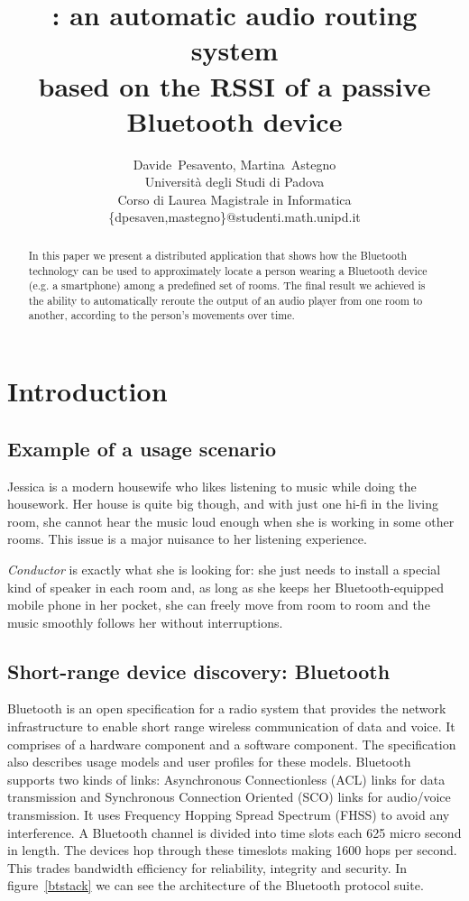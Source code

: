 \documentclass[conference]{IEEEtran}
\title{\Conductor{}: an automatic audio routing system\\based on the RSSI of a passive Bluetooth device}
\author{Davide~Pesavento, Martina~Astegno \\
	Università degli Studi di Padova \\
	Corso di Laurea Magistrale in Informatica \\
	\{dpesaven,mastegno\}@studenti.math.unipd.it
}
\newcommand{\Conductor}{\textsl{Conductor}}
\begin{document}
\maketitle

\begin{abstract}
In this paper we present a distributed application that shows how the Bluetooth technology can be used to approximately locate a person wearing a Bluetooth device (e.g. a smartphone) among a predefined set of rooms. The final result we achieved is the ability to automatically reroute the output of an audio player from one room to another, according to the person's movements over time.
\end{abstract}


\section{Introduction}

\subsection{Example of a usage scenario}
Jessica is a modern housewife who likes listening to music while doing the housework. Her house is quite big though, and with just one hi-fi in the living room, she cannot hear the music loud enough when she is working in some other rooms. This issue is a major nuisance to her listening experience.

\Conductor{} is exactly what she is looking for: she just needs to install a special kind of speaker in each room and, as long as she keeps her Bluetooth-equipped mobile phone in her pocket, she can freely move from room to room and the music smoothly follows her without interruptions.

\subsection{Short-range device discovery: Bluetooth}
Bluetooth is an open specification for a radio system that provides the network infrastructure to enable short range wireless communication of data and voice. It comprises of a hardware component and a software component. The specification also describes usage models and user profiles for these models.
Bluetooth supports two kinds of links: Asynchronous Connectionless (ACL) links for data transmission and Synchronous Connection Oriented (SCO) links for audio/voice transmission. It uses Frequency Hopping Spread Spectrum (FHSS) to avoid any interference. A Bluetooth channel is divided into time slots each 625 micro second in length. The devices hop through these timeslots making 1600 hops per second. This trades bandwidth efficiency for reliability, integrity and security.
In figure~\ref{btstack} we can see the architecture of the Bluetooth protocol suite.
\end{document}
